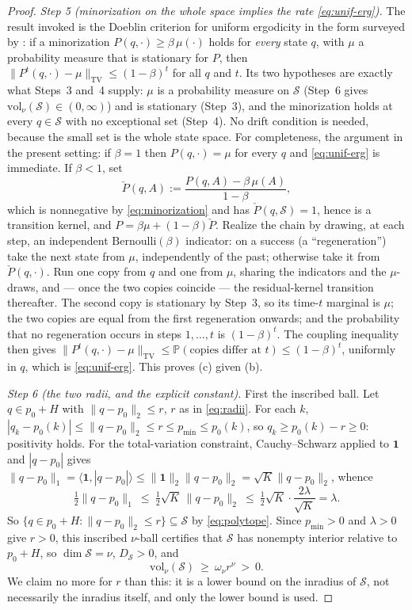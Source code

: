 \documentclass[11pt]{article}
\theoremstyle{plain}
\theoremstyle{definition}
\theoremstyle{remark}
\newcommand{\PP}{\mathbb{P}}
\newcommand{\cS}{\mathcal{S}}
\begin{document}
\begin{proof}
\emph{Step 5 (minorization on the whole space implies the rate \eqref{eq:unif-erg}).}
The result invoked is the Doeblin criterion for uniform ergodicity in the form surveyed
by \citet{roberts2004general}: if a minorization $P(q,\cdot)\ge\beta\,\mu(\cdot)$ holds
for \emph{every} state $q$, with $\mu$ a probability measure that is stationary for $P$,
then $\|P^t(q,\cdot)-\mu\|_{\mathrm{TV}}\le(1-\beta)^t$ for all $q$ and $t$. Its two
hypotheses are exactly what Steps~3 and~4 supply: $\mu$ is a probability measure on
$\cS$ (Step~6 gives $\mathrm{vol}_\nu(\cS)\in(0,\infty)$) and is stationary (Step~3), and
the minorization holds at every $q\in\cS$ with no exceptional set (Step~4). No drift
condition is needed, because the small set is the whole state space. For completeness,
the argument in the present setting: if $\beta=1$ then $P(q,\cdot)=\mu$ for every $q$ and
\eqref{eq:unif-erg} is immediate. If $\beta<1$, set
\[
    \check P(q,A) := \frac{P(q,A)-\beta\,\mu(A)}{1-\beta},
\]
which is nonnegative by \eqref{eq:minorization} and has $\check P(q,\cS)=1$, hence is a
transition kernel, and $P=\beta\mu+(1-\beta)\check P$. Realize the chain by drawing, at
each step, an independent $\mathrm{Bernoulli}(\beta)$ indicator: on a success (a
``regeneration'') take the next state from $\mu$, independently of the past; otherwise
take it from $\check P(q,\cdot)$. Run one copy from $q$ and one from $\mu$, sharing the
indicators and the $\mu$-draws, and --- once the two copies coincide --- the residual-kernel
transition thereafter. The second copy is stationary by Step~3, so its time-$t$
marginal is $\mu$; the two copies are equal from the first regeneration onwards; and the
probability that no regeneration occurs in steps $1,\dots,t$ is $(1-\beta)^t$. The
coupling inequality then gives
$\|P^t(q,\cdot)-\mu\|_{\mathrm{TV}}\le\PP(\text{copies differ at }t)\le(1-\beta)^t$,
uniformly in $q$, which is \eqref{eq:unif-erg}. This proves (c) given (b).

\emph{Step 6 (the two radii, and the explicit constant).} First the inscribed ball.
Let $q\in p_0+H$ with $\|q-p_0\|_2\le r$, $r$ as in \eqref{eq:radii}. For each $k$,
$|q_k-p_0(k)|\le\|q-p_0\|_2\le r\le p_{\min}\le p_0(k)$, so $q_k\ge p_0(k)-r\ge0$:
positivity holds. For the total-variation constraint, Cauchy--Schwarz applied to
$\mathbf1$ and $|q-p_0|$ gives
$\|q-p_0\|_1=\langle\mathbf1,|q-p_0|\rangle\le\|\mathbf1\|_2\|q-p_0\|_2=\sqrt K\|q-p_0\|_2$,
whence
\[
    \tfrac12\|q-p_0\|_1\ \le\ \tfrac12\sqrt K\,\|q-p_0\|_2
    \ \le\ \tfrac12\sqrt K\cdot\frac{2\lambda}{\sqrt K} = \lambda .
\]
So $\{q\in p_0+H:\|q-p_0\|_2\le r\}\subseteq\cS$ by \eqref{eq:polytope}. Since
$p_{\min}>0$ and $\lambda>0$ give $r>0$, this inscribed $\nu$-ball certifies that $\cS$
has nonempty interior relative to $p_0+H$, so $\dim\cS=\nu$, $D_\cS>0$, and
\begin{equation}\label{eq:vol-lower}
    \mathrm{vol}_\nu(\cS)\ \ge\ \omega_\nu r^\nu\ >\ 0 .
\end{equation}
We claim no more for $r$ than this: it is a lower bound on the inradius of $\cS$, not
necessarily the inradius itself, and only the lower bound is used.


\end{proof}
\end{document}
